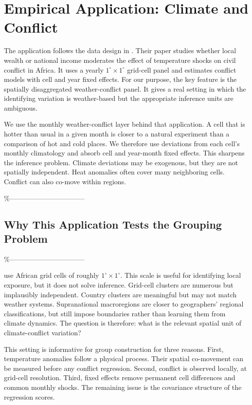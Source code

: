 \documentclass[
]{article}
\begin{document}
\section{Empirical Application: Climate and Conflict}

The application follows the data design in \citet{burke2024}. Their
paper studies whether local wealth or national income moderates the
effect of temperature shocks on civil conflict in Africa. It uses a
yearly \(1^\circ\times1^\circ\) grid-cell panel and estimates conflict
models with cell and year fixed effects. For our purpose, the key
feature is the spatially disaggregated weather-conflict panel. It gives
a real setting in which the identifying variation is weather-based but
the appropriate inference units are ambiguous.

We use the monthly weather-conflict layer behind that application. A
cell that is hotter than usual in a given month is closer to a natural
experiment than a comparison of hot and cold places. We therefore use
deviations from each cell's monthly climatology and absorb cell and
year-month fixed effects. This sharpens the inference problem. Climate
deviations may be exogenous, but they are not spatially independent.
Heat anomalies often cover many neighboring cells. Conflict can also
co-move within regions.

\%---------------------------------

\subsection{Why This Application Tests the Grouping Problem}

\%---------------------------------

\citet{burke2024} use African grid cells of roughly
\(1^\circ\times1^\circ\). This scale is useful for identifying local
exposure, but it does not solve inference. Grid-cell clusters are
numerous but implausibly independent. Country clusters are meaningful
but may not match weather systems. Supranational macroregions are closer
to geographers' regional classifications, but still impose boundaries
rather than learning them from climate dynamics. The question is
therefore: what is the relevant spatial unit of climate-conflict
variation?

This setting is informative for group construction for three reasons.
First, temperature anomalies follow a physical process. Their spatial
co-movement can be measured before any conflict regression. Second,
conflict is observed locally, at grid-cell resolution. Third, fixed
effects remove permanent cell differences and common monthly shocks. The
remaining issue is the covariance structure of the regression scores.
\end{document}
